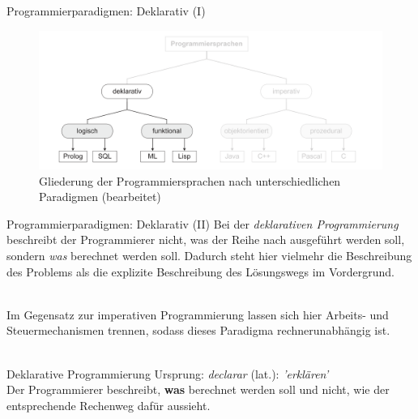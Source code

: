             \begin{frame}{Programmierparadigmen: Deklarativ (I)}
                \begin{figure}
                    \centering
                    \includegraphics[width=\linewidth,height=0.5\textheight,keepaspectratio]{chapters/04_programming_languages/figures/paradigms/declarative.png}
                    \caption{Gliederung der Programmiersprachen nach unterschiedlichen Paradigmen \cite{Muller2015} (bearbeitet)}
                \end{figure}   
            \end{frame}
            
            \begin{frame}{Programmierparadigmen: Deklarativ (II)}
                Bei der \textit{deklarativen Programmierung} beschreibt der Programmierer nicht, was der Reihe nach ausgeführt werden soll, sondern \textit{was} berechnet werden soll. Dadurch steht hier vielmehr die Beschreibung des Problems als die explizite Beschreibung des Lösungswegs im Vordergrund. \\~\
                
                Im Gegensatz zur imperativen Programmierung lassen sich hier Arbeits- und Steuermechanismen trennen, sodass dieses Paradigma rechnerunabhängig ist. \\~\
                
                \begin{block}{Deklarative Programmierung}
                    Ursprung: \textit{declarar} (lat.): \textit{'erklären'} \\
                    Der Programmierer beschreibt, \textbf{was} berechnet werden soll und nicht, wie der entsprechende Rechenweg dafür aussieht.
               \end{block}
               
            \end{frame}
            
